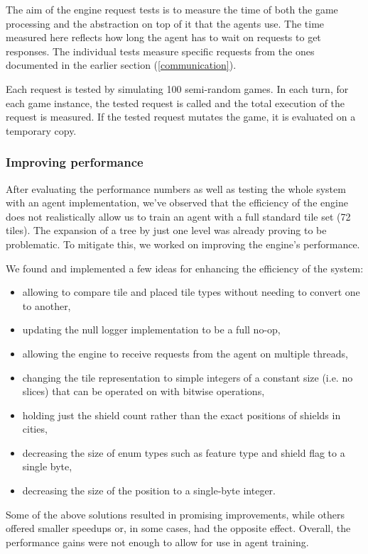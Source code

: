 The aim of the engine request tests is to measure the time of both the game processing
and the abstraction on top of it that the agents use. The time measured here reflects
how long the agent has to wait on requests to get responses. The individual tests measure
specific requests from the ones documented in the earlier section (\ref{communication}).

Each request is tested by simulating 100 semi-random games. In each turn, for each game instance,
the tested request is called and the total execution of the request is measured.
If the tested request mutates the game, it is evaluated on a temporary copy.

\subsubsection{Improving performance}

After evaluating the performance numbers as well as testing the whole system with
an agent implementation, we've observed that the efficiency of the engine does not
realistically allow us to train an agent with a full standard tile set (72 tiles).
The expansion of a tree by just one level was already proving to be problematic.
To mitigate this, we worked on improving the engine's performance.

We found and implemented a few ideas for enhancing the efficiency of the system:
\begin{itemize}
	\item allowing to compare tile and placed tile types without needing to convert one to another,
    \item updating the null logger implementation to be a full no-op,
    \item allowing the engine to receive requests from the agent on multiple threads,
    \item changing the tile representation to simple integers of a constant size (i.e. no slices)
          that can be operated on with bitwise operations,
    \item holding just the shield count rather than the exact positions of shields in cities,
    \item decreasing the size of enum types such as feature type and shield flag to a single byte,
    \item decreasing the size of the position to a single-byte integer.
\end{itemize}
Some of the above solutions resulted in promising improvements,
while others offered smaller speedups or, in some cases, had the opposite effect.
Overall, the performance gains were not enough to allow for use in agent training.
